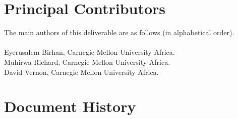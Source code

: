\documentclass{CSSRforAfrica}
\newcommand{\blank}{~\\}
\begin{document}
\newpage


 

\pagebreak
\section*{Principal Contributors}
\label{contributors}
The main authors of this deliverable are as follows (in alphabetical order).
\blank
~
\blank
Eyerusalem Birhan, Carnegie Mellon University Africa.\\    
Muhirwa Richard, Carnegie Mellon University Africa.\\   
David Vernon, Carnegie Mellon University Africa.\\   
  

\newpage
\section*{Document History}
\label{document_history}
\end{document}
